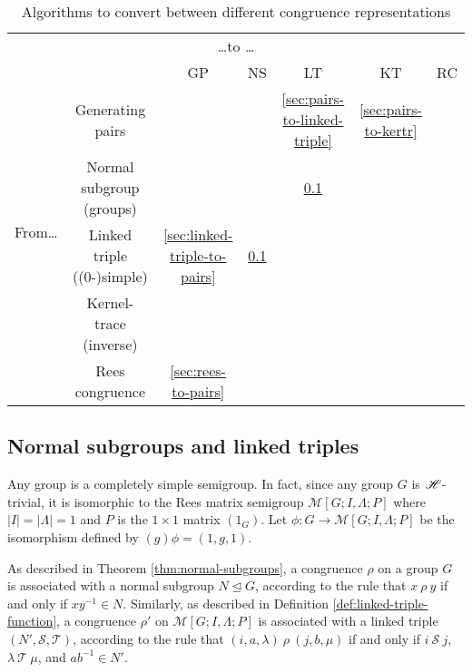 \begin{table}[h]
  \centering
  \renewcommand{\arraystretch}{1.3}
  \begin{tabular}{ c | c | c | c | c | c | c |}
    \multicolumn{7}{c}{\qquad\qquad\qquad\qquad\qquad\qquad\qquad\qquad\qquad \ldots to \ldots} \\
    \cline{2-7}
    \multirow{7}{*}{From\ldots} &  & GP & NS & LT & KT & RC \\
    \cline{2-7}
    & Generating pairs & \cellcolor{gray} &  & \ref{sec:pairs-to-linked-triple} & \ref{sec:pairs-to-kertr} & \\
    \cline{2-7}
    & Normal subgroup (groups) &  & \cellcolor{gray} & \ref{sec:normal-subgroup-to-linked-triple} &  & \\
    \cline{2-7}
    & Linked triple ((0-)simple) & \ref{sec:linked-triple-to-pairs} & \ref{sec:normal-subgroup-to-linked-triple} & \cellcolor{gray} & &\\
    \cline{2-7}
    & Kernel-trace (inverse) &  &  &  & \cellcolor{gray} &\\
    \cline{2-7}
    & Rees congruence & \ref{sec:rees-to-pairs} &  &  &  & \cellcolor{gray}\\
    \cline{2-7}
  \end{tabular}
  \renewcommand{\arraystretch}{0.7}
  \caption{Algorithms to convert between different congruence representations}
  \label{tab:converting}
\end{table}

\subsection{Normal subgroups and linked triples}
\label{sec:normal-subgroup-to-linked-triple}
Any group is a completely simple semigroup.  In fact, since any group $G$ is
$\mathrel{\mathscr{H}}$-trivial, it is isomorphic to the Rees matrix semigroup
$\mathcal{M}[G; I, \Lambda; P]$ where $|I|=|\Lambda|={1}$ and $P$ is the
$1 \times 1$ matrix $(1_G)$.  Let $\phi: G \to \mathcal{M}[G; I, \Lambda; P]$ be
the isomorphism defined by $(g)\phi = (1, g, 1)$.

As described in Theorem \ref{thm:normal-subgroups}, a congruence $\rho$ on a
group $G$ is associated with a normal subgroup $N \trianglelefteq G$, according
to the rule that $x ~\rho~ y$ if and only if $xy^{-1} \in N$.  Similarly, as
described in Definition \ref{def:linked-triple-function}, a congruence $\rho'$
on $\mathcal{M}[G; I, \Lambda; P]$ is associated with a linked triple
$(N', \mathcal{S}, \mathcal{T})$, according to the rule that
$(i, a, \lambda) ~\rho~ (j, b, \mu)$ if and only if $i ~\mathcal{S}~ j$,
$\lambda ~\mathcal{T}~ \mu$, and $ab^{-1} \in N'$. %

